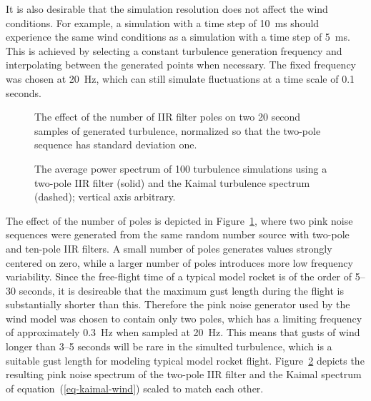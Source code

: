 It is also desirable that the simulation resolution does not affect
the wind conditions.  For example, a simulation with a time step of
10~ms should experience the same wind conditions as a simulation with
a time step of 5~ms.  This is achieved by selecting a constant
turbulence generation frequency and interpolating between the
generated points when necessary.  The fixed frequency was chosen at
20~Hz, which can still simulate fluctuations at a time scale of 0.1
seconds.

\begin{figure}[p]
\centering
{}
\caption{The effect of the number of IIR filter poles on two 20 second
  samples of generated turbulence, normalized so that the two-pole
  sequence has standard deviation one.}
\label{fig-pink-poles}
\end{figure}

\begin{figure}[p]
\centering
{}
\caption{The average power spectrum of 100 turbulence
  simulations using a two-pole IIR filter (solid) and the Kaimal
  turbulence spectrum (dashed); vertical axis arbitrary.}
\label{fig-pink-spectrum}
\end{figure}



The effect of the number of poles is depicted in
Figure~\ref{fig-pink-poles}, where two pink noise sequences were
generated from the same random number source with two-pole and
ten-pole IIR filters.  A small number of poles generates values strongly
centered on zero, while a larger number of poles introduces more low
frequency variability.  Since the free-flight time of a typical model
rocket is of the order of 5--30 seconds, it is desireable that the
maximum gust length during the flight is substantially shorter than
this.  Therefore the pink noise generator used by the wind model was
chosen to contain only two poles, which has a limiting frequency of
approximately 0.3~Hz when sampled at 20~Hz.  This means that gusts of
wind longer than 3--5 seconds will be rare in the simulted turbulence,
which is a suitable gust length for modeling typical model rocket
flight. Figure~\ref{fig-pink-spectrum} depicts the resulting pink
noise spectrum of the two-pole IIR filter and the Kaimal spectrum of
equation~(\ref{eq-kaimal-wind}) scaled to match each other.





